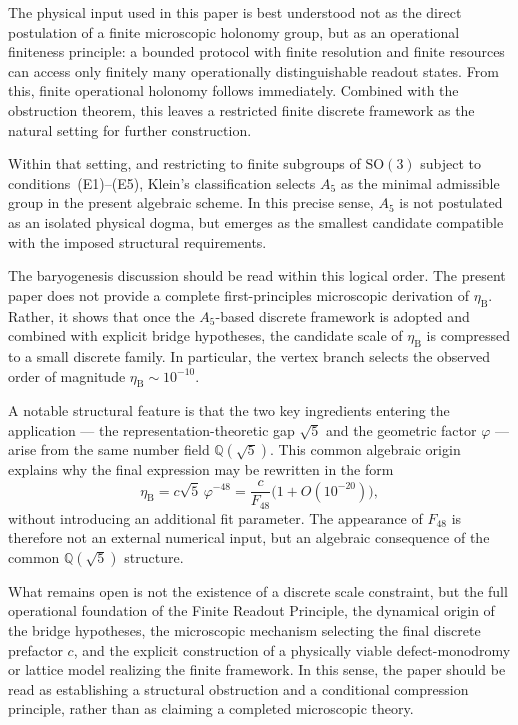 \documentclass[sn-mathphys-num,Numbered]{sn-jnl}
\theoremstyle{thmstyleone}
\theoremstyle{thmstylethree}
\theoremstyle{thmstyletwo}
\newcommand{\SO}{\mathrm{SO}}
\newcommand{\etaB}{\eta_{\mathrm{B}}}
\newcommand{\Qsqrt}{\mathbb{Q}(\sqrt{5})}
\begin{document}
The physical input used in this paper is best understood not as the
direct postulation of a finite microscopic holonomy group, but as an
operational finiteness principle: a bounded protocol with finite
resolution and finite resources can access only finitely many
operationally distinguishable readout states. From this, finite
operational holonomy follows immediately. Combined with the obstruction
theorem, this leaves a restricted finite discrete framework as the
natural setting for further construction.

Within that setting, and restricting to finite subgroups of $\SO(3)$
subject to conditions~(E1)--(E5), Klein's classification selects $A_5$
as the minimal admissible group in the present algebraic scheme. In
this precise sense, $A_5$ is not postulated as an isolated physical
dogma, but emerges as the smallest candidate compatible with the
imposed structural requirements.

The baryogenesis discussion should be read within this logical order.
The present paper does not provide a complete first-principles
microscopic derivation of $\etaB$. Rather, it shows that once the
$A_5$-based discrete framework is adopted and combined with explicit
bridge hypotheses, the candidate scale of $\etaB$ is compressed to a
small discrete family. In particular, the vertex branch selects the
observed order of magnitude $\etaB\sim10^{-10}$.

A notable structural feature is that the two key ingredients entering
the application --- the representation-theoretic gap $\sqrt{5}$ and the
geometric factor $\varphi$ --- arise from the same number field
$\Qsqrt$. This common algebraic origin explains why the final
expression may be rewritten in the form
\[
\etaB = c\sqrt{5}\,\varphi^{-48}
       = \frac{c}{F_{48}}\bigl(1+O(10^{-20})\bigr),
\]
without introducing an additional fit parameter. The appearance of
$F_{48}$ is therefore not an external numerical input, but an algebraic
consequence of the common $\Qsqrt$ structure.

What remains open is not the existence of a discrete scale constraint,
but the full operational foundation of the Finite Readout Principle,
the dynamical origin of the bridge hypotheses, the microscopic
mechanism selecting the final discrete prefactor $c$, and the explicit
construction of a physically viable defect-monodromy or lattice model
realizing the finite framework. In this sense, the paper should be read
as establishing a structural obstruction and a conditional compression
principle, rather than as claiming a completed microscopic theory.
\end{document}
